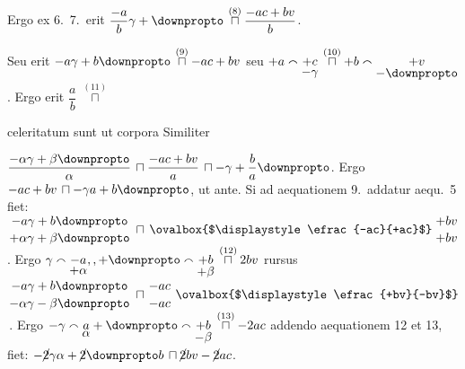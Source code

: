 %
Ergo ex 6.\ 7.\ erit $\dfrac{-a}{b}\gamma + \protect\rotatebox{0}{$\downpropto$} \,\overset{(8)}\sqcap \dfrac{-ac+bv}{b}$. 
%
\rule[0cm]{0mm}{16pt}%
Seu erit
$-a\gamma + b\protect\rotatebox{0}{$\downpropto$} \,\overset{(9)}\sqcap -ac+bv $
seu $ +a \smallfrown \underset{{\displaystyle -\gamma}}{+c} \,\overset{(10)}\sqcap 
+b\smallfrown \underset{{\displaystyle -\protect\rotatebox{0}{$\downpropto$}}}{+v}$.
Ergo erit $\dfrac{a}{b} \; \overset{(11)}\sqcap $
%
\rule[0cm]{0mm}{10pt}%
celeritatum%
\protect{} sunt ut corpora 
%
\pend
\newpage
%
\pstart 
Similiter \rule[0cm]{0mm}{16pt}%
$\dfrac{-\alpha\gamma+\beta\protect\rotatebox{0}{$\downpropto$}}{\alpha} \,\sqcap \dfrac{-ac+bv}{a} \,\sqcap
-\gamma + \dfrac{b}{a}\protect\rotatebox{0}{$\downpropto$}$. Ergo $-ac+bv \,\sqcap -\gamma a + b\protect\rotatebox{0}{$\downpropto$}$, ut ante.
\pend
%
\pstart 
Si ad aequationem 9.\ addatur aequ.\ 5 fiet: 
$\genfrac{}{}{0pt}{0}{-a\gamma + b\protect\rotatebox{0}{$\downpropto$}}{+\alpha\gamma + \beta\protect\rotatebox{0}{$\downpropto$}} \,\sqcap
\,\ovalbox{$\displaystyle\efrac{-ac}{+ac}$} \, \displaystyle\efrac{+bv}{+bv}$.
Ergo  $ \gamma \smallfrown \underset{{\displaystyle +\alpha}}{-a},, 
+\protect\rotatebox{0}{$\downpropto$}\smallfrown \underset{{\displaystyle +\beta}}{+b}\,\overset{(12)}\sqcap 2bv$
rursus $\genfrac{}{}{0pt}{0}{-a\gamma + b\protect\rotatebox{0}{$\downpropto$}}{-\alpha\gamma - \beta\protect\rotatebox{0}{$\downpropto$}} \,\sqcap
\displaystyle\efrac{-ac}{-ac}\; \ovalbox{$\displaystyle\efrac{+bv}{-bv}$} $\,.
Ergo  $ -\gamma \smallfrown \underset{{\displaystyle \alpha}}{a} 
+\protect\rotatebox{0}{$\downpropto$}\smallfrown \underset{{\displaystyle -\beta}}{+b}\,\overset{(13)}\sqcap -2ac$ addendo 
aequationem 12 et 13, fiet:
$-\cancel 2 \gamma\alpha + \cancel 2 \protect\rotatebox{0}{$\downpropto$} b \,\sqcap \cancel 2 bv - \cancel 2 ac$.
